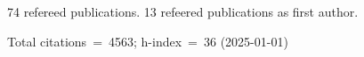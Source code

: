 74 refereed publications. 13 refeered publications as first author.

Total citations~=~4563; h-index~=~36 (2025-01-01)